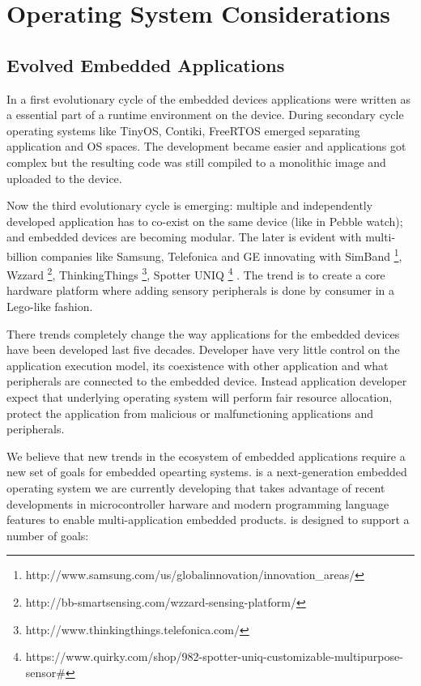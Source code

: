 \section{Operating System Considerations}


\subsection{Evolved Embedded Applications}
In a first evolutionary cycle of the embedded devices applications were written
as a essential part of a runtime environment on the device. During secondary
cycle operating systems like TinyOS, Contiki, FreeRTOS emerged separating
application and OS spaces. The development became easier  and applications
got complex but the resulting code was still compiled to a monolithic image and
uploaded to the device.

Now the third evolutionary cycle is emerging: multiple and independently
developed application has to co-exist on the same device (like in Pebble watch);
and embedded devices are becoming modular. The later is evident with
multi-billion companies like Samsung, Telefonica and GE innovating with SimBand
\footnote{http://www.samsung.com/us/globalinnovation/innovation_areas/}, Wzzard
\footnote{http://bb-smartsensing.com/wzzard-sensing-platform/}, ThinkingThings
\footnote{http://www.thinkingthings.telefonica.com/}, Spotter UNIQ
\footnote{https://www.quirky.com/shop/982-spotter-uniq-customizable-multipurpose-sensor#}
. The trend is to create a core hardware platform where adding sensory
peripherals is done by consumer in a Lego-like fashion.

There trends completely change the way applications for the embedded devices
have been developed last five decades. Developer have very little control on the
application execution model, its coexistence with other application and what
peripherals are connected to the embedded device. Instead application developer
expect that underlying operating system will perform fair resource allocation,
protect the application from malicious or malfunctioning applications and
peripherals. 







We believe that new trends in the ecosystem of embedded applications require a
new set of goals for embedded opearting systems. \name is a next-generation
embedded operating system we are currently developing that takes advantage of
recent developments in microcontroller harware and modern programming language
features to enable multi-application embedded products. \name is designed to
support a number of goals:

